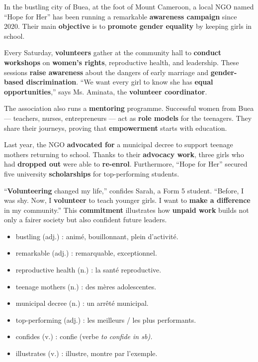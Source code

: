 \documentclass[11pt]{article}
\newcommand{\cle}[1]{{\popxbold\color{popdark}#1}}
\newcommand{\eng}[1]{\ifmmode\text{\textit{#1}}\else\begingroup\selectlanguage{english}\itshape #1\endgroup\fi}
\begin{document}
\begin{textebox}
In the bustling city of Buea, at the foot of Mount Cameroon, a local NGO named “Hope for Her” has been running a remarkable \textbf{awareness campaign} since 2020. Their main \textbf{objective} is to \textbf{promote gender equality} by keeping girls in school. 

Every Saturday, \textbf{volunteers} gather at the community hall to \textbf{conduct workshops} on \textbf{women's rights}, reproductive health, and leadership. These sessions \textbf{raise awareness} about the dangers of early marriage and \textbf{gender-based discrimination}. “We want every girl to know she has \textbf{equal opportunities},” says Ms. Aminata, the \textbf{volunteer coordinator}. 

The association also runs a \textbf{mentoring} programme. Successful women from Buea — teachers, nurses, entrepreneurs — act as \textbf{role models} for the teenagers. They share their journeys, proving that \textbf{empowerment} starts with education. 

Last year, the NGO \textbf{advocated for} a municipal decree to support teenage mothers returning to school. Thanks to their \textbf{advocacy work}, three girls who had \textbf{dropped out} were able to \textbf{re-enrol}. Furthermore, “Hope for Her” secured five university \textbf{scholarships} for top-performing students. 

“\textbf{Volunteering} changed my life,” confides Sarah, a Form 5 student. “Before, I was shy. Now, I \textbf{volunteer} to teach younger girls. I want to \textbf{make a difference} in my community.” This \textbf{commitment} illustrates how \textbf{unpaid work} builds not only a fairer society but also confident future leaders.
\end{textebox}

\begin{definition}
\begin{itemize}
    \item \cle{bustling} (adj.) : animé, bouillonnant, plein d'activité.
    \item \cle{remarkable} (adj.) : remarquable, exceptionnel.
    \item \cle{reproductive health} (n.) : la santé reproductive.
    \item \cle{teenage mothers} (n.) : des mères adolescentes.
    \item \cle{municipal decree} (n.) : un arrêté municipal.
    \item \cle{top-performing} (adj.) : les meilleurs / les plus performants.
    \item \cle{confides} (v.) : confie (verbe \eng{to confide in sb}).
    \item \cle{illustrates} (v.) : illustre, montre par l'exemple.
\end{itemize}
\end{definition}
\end{document}
